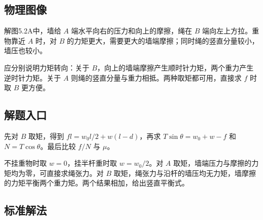 \documentclass[UTF8,fontset=fandol,a4paper,11pt]{ctexart}
\begin{document}


\subsection*{物理图像}

解图5.2A中，墙给 $A$ 端水平向右的压力和向上的摩擦，绳在 $B$ 端向左上方拉。重物靠近 $A$ 时，对 $B$ 的力矩更大，需要更大的墙端摩擦；同时绳的竖直分量较小，墙压也较小。

应分别说明力矩转向：关于 $B$，向上的墙端摩擦产生顺时针力矩，两个重力产生逆时针力矩。关于 $A$ 则绳的竖直分量与重力相抵。两种取矩都可用，直接求 $f$ 时取 $B$ 更方便。



\subsection*{解题入口}

先对 $B$ 取矩，得到 $fl=w_0l/2+w(l-d)$，再求 $T\sin\theta=w_0+w-f$ 和 $N=T\cos\theta$。最后比较 $f/N$ 与 $\mu$。

不挂重物时取 $w=0$，挂半杆重时取 $w=w_0/2$。对 $A$ 取矩，墙端压力与摩擦的力矩均为零，可直接求绳张力。对 $B$ 取矩，绳张力与沿杆的墙压均无力矩，墙摩擦的力矩平衡两个重力矩。两个结果相加，给出竖直平衡式。



\subsection*{标准解法}
\end{document}
